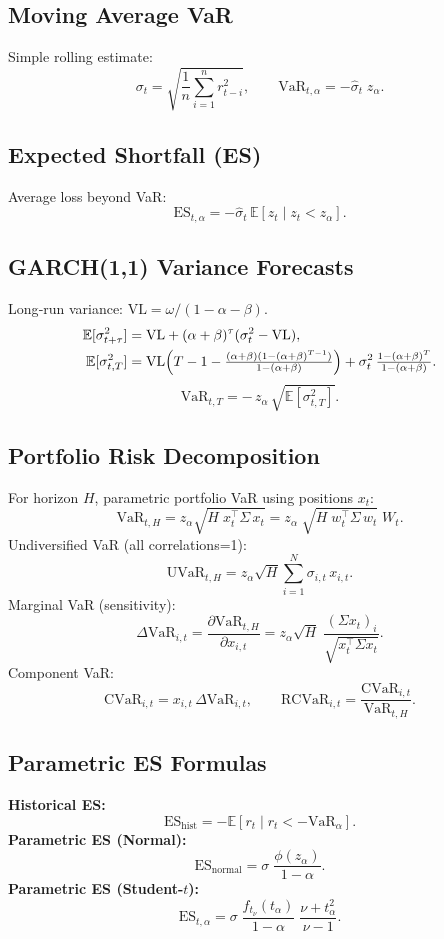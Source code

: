 \documentclass[12pt]{article}
\begin{document}
\subsection*{Moving Average VaR}
Simple rolling estimate:
\[
  \sigma_t = \sqrt{\frac{1}{n}\sum_{i=1}^n r_{t-i}^2},
  \qquad
  \text{VaR}_{t,\alpha} = -\hat{\sigma}_t \; z_\alpha.
\]

\subsection*{Expected Shortfall (ES)}
Average loss beyond VaR:
\[
  \text{ES}_{t,\alpha} = -\hat{\sigma}_t \,\mathbb{E}[z_t \mid z_t < z_\alpha].
\]

\subsection*{GARCH(1,1) Variance Forecasts}
Long‑run variance: $\mathrm{VL}=\omega/(1-\alpha-\beta)$.  
\begin{align*}
  \mathbb{E}[\sigma_{t+\tau}^2] &= \mathrm{VL} + (\alpha+\beta)^\tau(\sigma_t^2 - \mathrm{VL}),  \\  
  \mathbb{E}[\sigma_{t,T}^2] &= \mathrm{VL}\Bigl(T-1 - \tfrac{(\alpha+\beta)(1-(\alpha+\beta)^{T-1})}{1-(\alpha+\beta)}\Bigr)
    + \sigma_t^2\,\tfrac{1-(\alpha+\beta)^T}{1-(\alpha+\beta)}.
\end{align*}
\[
  \text{VaR}_{t,T} = -\,z_\alpha \,\sqrt{\mathbb{E}[\sigma_{t,T}^2] }.
\]

\subsection*{Portfolio Risk Decomposition}
For horizon $H$, parametric portfolio VaR using positions $x_t$:
\[
  \mathrm{VaR}_{t,H} = z_\alpha \sqrt{H\;x_t^\top\Sigma\,x_t}
  = z_\alpha\;\sqrt{H\;w_t^\top\Sigma\,w_t}\;W_t.
\]
Undiversified VaR (all correlations=1):
\[
  \mathrm{UVaR}_{t,H} = z_\alpha\sqrt{H}\sum_{i=1}^N\sigma_{i,t}\,x_{i,t}.
\]
Marginal VaR (sensitivity):
\[
  \Delta\mathrm{VaR}_{i,t} = \frac{\partial\mathrm{VaR}_{t,H}}{\partial x_{i,t}}
    = z_\alpha\sqrt{H}\;\frac{(\Sigma x_t)_i}{\sqrt{x_t^\top\Sigma x_t}}.
\]
Component VaR:
\[
  \mathrm{CVaR}_{i,t} = x_{i,t}\,\Delta\mathrm{VaR}_{i,t},
  \qquad
  \mathrm{RCVaR}_{i,t} = \frac{\mathrm{CVaR}_{i,t}}{\mathrm{VaR}_{t,H}}.
\]

\subsection*{Parametric ES Formulas}
\textbf{Historical ES:}
\[
  \text{ES}_{\mathrm{hist}} = -\mathbb{E}[r_t \mid r_t < -\mathrm{VaR}_\alpha].
\]
\textbf{Parametric ES (Normal):}
\[
  \text{ES}_{\mathrm{normal}} = \sigma\;\frac{\phi(z_\alpha)}{1-\alpha}.
\]
\textbf{Parametric ES (Student-$t$):}
\[
  \text{ES}_{t,\alpha} = \sigma\;\frac{f_{t_\nu}(t_\alpha)}{1-\alpha}\;\frac{\nu + t_\alpha^2}{\nu - 1}.
\]
\end{document}

